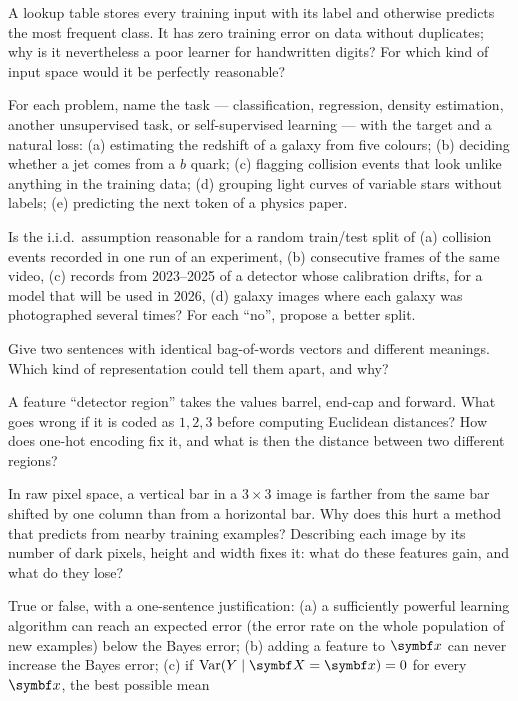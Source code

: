 \documentclass[11pt]{article}
\begin{document}
\begin{questions}
\begin{conceptual}
\item A lookup table stores every training input with its label and otherwise predicts the most frequent class. It
has zero training error on data without duplicates; why is it nevertheless a poor learner for handwritten digits?
For which kind of input space would it be perfectly reasonable?
\item For each problem, name the task --- classification, regression, density estimation, another unsupervised
task, or self-supervised learning --- with the target and a natural loss: (a) estimating the redshift of a galaxy
from five colours; (b) deciding
whether a jet comes from a $b$ quark; (c) flagging collision events that look unlike anything in the training data;
(d) grouping light curves of variable stars without labels; (e) predicting the next token of a physics paper.
\item Is the i.i.d.\ assumption reasonable for a random train/test split of (a) collision events recorded in one run
of an experiment, (b) consecutive frames of the same video, (c) records from 2023--2025 of a detector whose
calibration drifts, for a model that will be used in 2026, (d) galaxy images
where each galaxy was photographed several times? For each ``no'', propose a better split.
\item Give two sentences with identical bag-of-words vectors and different meanings. Which kind of representation
could tell them apart, and why?
\item A feature ``detector region'' takes the values barrel, end-cap and forward. What goes wrong if it is coded as
$1, 2, 3$ before computing Euclidean distances? How does one-hot encoding fix it, and what is then the distance
between two different regions?
\item In raw pixel space, a vertical bar in a $3 \times 3$ image is farther from the same bar shifted by one column
than from a horizontal bar. Why does this hurt a method that predicts from nearby training examples? Describing each
image by its number of dark pixels, height and width fixes it: what do these features gain, and what do they lose?
\item True or false, with a one-sentence justification: (a) a sufficiently powerful learning algorithm can reach an
expected error (the error rate on the whole population of new examples) below the Bayes error; (b) adding a feature to
$\x$ can never increase the Bayes error; (c) if $\Var(Y \mid \X = \x) = 0$ for every $\x$, the best possible mean

\end{conceptual}
\end{questions}
\end{document}
